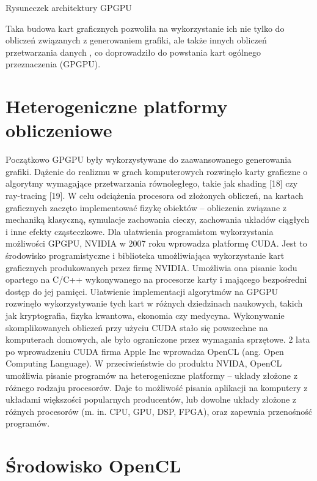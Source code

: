 Rysuneczek architektury GPGPU

Taka budowa kart graficznych pozwoliła na wykorzystanie ich nie tylko do obliczeń związanych z generowaniem grafiki, ale także innych obliczeń przetwarzania danych , co doprowadziło do powstania kart ogólnego przeznaczenia (GPGPU).




\section{Heterogeniczne platformy obliczeniowe}\label{sec:hetero}

Początkowo GPGPU były wykorzystywane do zaawansowanego generowania grafiki. Dążenie do realizmu w grach komputerowych rozwinęło karty graficzne o algorytmy wymagające przetwarzania równoległego, takie jak shading [18] czy ray-tracing [19]. W celu odciążenia procesora od złożonych obliczeń, na kartach graficznych zaczęto implementować fizykę obiektów – obliczenia związane z mechaniką klasyczną, symulacje zachowania cieczy, zachowania układów ciągłych i inne efekty cząsteczkowe. Dla ułatwienia programistom wykorzystania możliwości GPGPU, NVIDIA w 2007 roku wprowadza platformę CUDA. Jest to środowisko programistyczne i biblioteka umożliwiająca wykorzystanie kart graficznych produkowanych przez firmę NVIDIA. Umożliwia ona pisanie kodu opartego na C/C++ wykonywanego na procesorze karty i mającego bezpośredni dostęp do jej pamięci. Ułatwienie implementacji algorytmów na GPGPU rozwinęło wykorzystywanie tych kart w różnych dziedzinach naukowych, takich jak kryptografia, fizyka kwantowa, ekonomia czy medycyna. Wykonywanie  skomplikowanych obliczeń przy użyciu CUDA stało się powszechne na komputerach domowych, ale było ograniczone przez wymagania sprzętowe. 2 lata po wprowadzeniu CUDA firma Apple Inc wprowadza OpenCL (ang. Open Computing Language). W przeciwieństwie do produktu NVIDA, OpenCL umożliwia pisanie programów na heterogeniczne platformy – układy złożone z różnego rodzaju procesorów. Daje to możliwość pisania aplikacji na komputery z układami większości popularnych producentów, lub dowolne układy złożone z różnych procesorów (m. in. CPU, GPU, DSP, FPGA), oraz zapewnia przenośność programów.


\section{Środowisko OpenCL}\label{sec:OpenCL}

